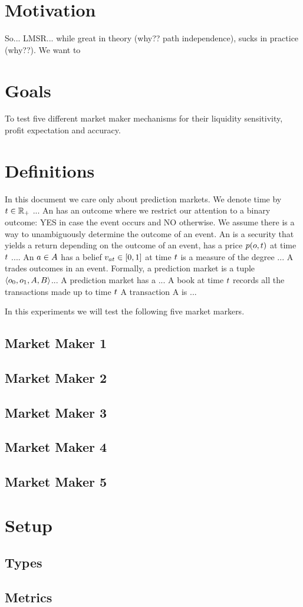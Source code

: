 \section{Motivation}

So... LMSR... while great in theory (why?? path independence), sucks in practice (why??).
We want to 

\section{Goals}
To test five different market maker mechanisms for their liquidity sensitivity,
profit expectation and accuracy.  


\section{Definitions}

In this document we care only about prediction markets. 
We denote time by $t\in\mathbb{R}_+$ ...
An  has an outcome where we restrict
our attention to a binary outcome: YES in case the event occurs 
and NO otherwise. We assume there is a way to unambiguously determine the outcome of an event. 
An  is a security that yields a return depending on the outcome
of an event, has a price 
$p(o,t)$ at time $t$ ....
An  $a\in A$ has 
a belief $v_{at} \in [0,1]$ at time $t$ 
is a measure of the degree ...
A  trades outcomes in an event. Formally,
a prediction market is a tuple $\left<o_0,o_1, A, B\right>$...
A prediction market has a ... 
A book at time $t$ records all the transactions made up to time $t$
A transaction 
A  is ...

In this experiments we will test the following five market markers.
\subsection{Market Maker 1}
\subsection{Market Maker 2}
\subsection{Market Maker 3}
\subsection{Market Maker 4}
\subsection{Market Maker 5}

\section{Setup}

\subsection{Types}

\subsection{Metrics}

